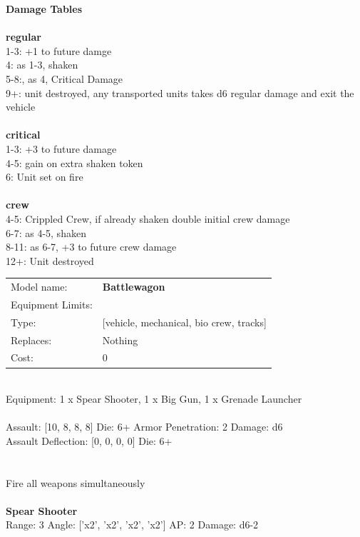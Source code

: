 {\bf Damage Tables} \\
\ \\ {\bf regular } \\
1-3: +1 to future damge \\
4: as 1-3, shaken \\
5-8:,  as 4, Critical Damage \\
9+: unit destroyed, any transported units takes d6 regular damage and exit the vehicle \\
\ \\ {\bf critical } \\
1-3: +3 to future damage \\
4-5: gain on extra shaken token \\
6: Unit set on fire \\
\ \\ {\bf crew } \\
4-5: Crippled Crew, if already shaken double initial crew damage \\
6-7: as 4-5, shaken \\
8-11: as 6-7, +3 to future crew damage \\
12+: Unit destroyed \\


\noindent
\begin{tabular}{ll}
Model name: &{\bf Battlewagon } \\
Equipment Limits: & \\
Type: &[vehicle, mechanical, bio crew, tracks] \\
Replaces: &Nothing \\
Cost: & 0\\
\end{tabular}
\ \\
Equipment: 1 x Spear Shooter, 1 x Big Gun, 1 x Grenade Launcher \\
\ \\
Assault: [10, 8, 8, 8] Die: 6+ Armor Penetration: 2 Damage: d6 \\
Assault Deflection: [0, 0, 0, 0] Die: 6+\\
\\ 
 
\ \\
Fire all weapons simultaneously\\ 

\ \\
{\bf Spear Shooter } \\



Range: 3  Angle: ['x2', 'x2', 'x2', 'x2'] AP: 2 Damage: d6-2 \\




